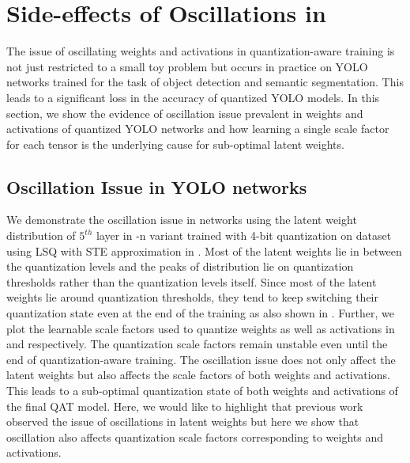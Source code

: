 \section{Side-effects of Oscillations in \yolo}
\label{sec:yolo-sideeffects}
The issue of oscillating weights and activations in quantization-aware training is not just restricted to a small toy problem but occurs in practice on \acrshort{YOLO} networks \cite{yolov5, wang2022yolov7} trained for the task of object detection and semantic segmentation. This leads to a significant loss in the accuracy of quantized \acrshort{YOLO} models. In this section, we show the evidence of oscillation issue prevalent in weights and activations of quantized \acrshort{YOLO} networks and how learning a single scale factor for each tensor is the underlying cause for sub-optimal latent weights.
\subsection{Oscillation Issue in YOLO networks}
\label{sec:yolo-oscillation}


We demonstrate the oscillation issue in \yolo networks using the latent weight distribution of $5^{th}$ layer in \yoloa-n variant \cite{yolov5} trained with 4-bit quantization on \coco dataset \cite{lin2014microsoft} using \acrfull{LSQ} \cite{lsq} with \gls{STE} approximation in . Most of the latent weights lie in between the quantization levels and the peaks of distribution lie on quantization thresholds rather than the quantization levels itself. Since most of the latent weights lie around quantization thresholds, they tend to keep switching their quantization state even at the end of the training as also shown in \cite{nagel2022overcoming}. Further, we plot the learnable scale factors used to quantize weights as well as activations in  and  respectively. The quantization scale factors remain unstable even until the end of quantization-aware training. The oscillation issue does not only affect the latent weights but also affects the scale factors of both weights and activations. This leads to a sub-optimal quantization state of both weights and activations of the final QAT model. Here, we would like to highlight that previous work~\cite{nagel2022overcoming} observed the issue of oscillations in latent weights but here we show that oscillation also affects quantization scale factors corresponding to weights and activations.   

